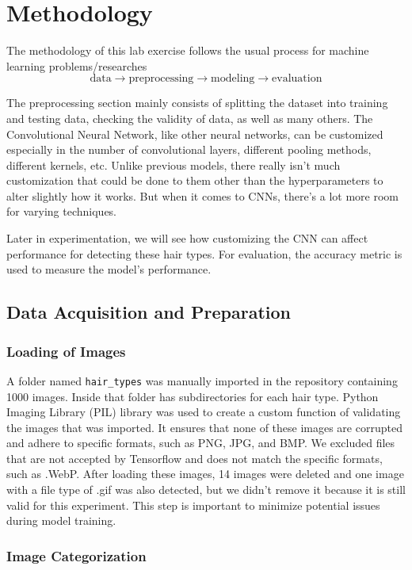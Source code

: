\section{Methodology}

The methodology of this lab exercise follows the usual process for machine learning problems/researches
\[
  \text{data} \to \text{preprocessing} \to \text{modeling} \to \text{evaluation}
\]

The preprocessing section mainly consists of splitting the dataset into training and testing data, checking the validity of data, as well as many others. The Convolutional Neural Network, like other neural networks, can be customized especially in the number of convolutional layers, different pooling methods, different kernels, etc. Unlike previous models, there really isn't much customization that could be done to them other than the hyperparameters to alter slightly how it works. But when it comes to CNNs, there's a lot more room for varying techniques. 

Later in experimentation, we will see how customizing the CNN can affect performance for detecting these hair types. For evaluation, the accuracy metric is used to measure the model's performance. 

\subsection{Data Acquisition and Preparation}

\subsubsection{Loading of Images}

A folder named \texttt{hair\_types} was manually imported in the repository containing 1000 images. Inside that folder has subdirectories for each hair type. Python Imaging Library (PIL) library was used to create a custom function of validating the images that was imported. It ensures that none of these images are corrupted and adhere to specific formats, such as PNG, JPG, and BMP. We excluded files that are not accepted by Tensorflow and does not match the specific formats, such as .WebP. After loading these images, 14 images were deleted and one image with a file type of .gif was also detected, but we didn't remove it because it is still valid for this experiment. This step is important to minimize potential issues during model training.

\subsubsection{Image Categorization}

